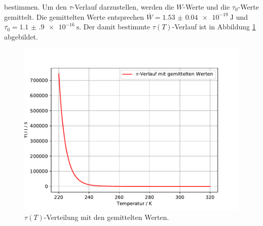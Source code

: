 bestimmen.
Um den $\tau$-Verlauf darzustellen, werden die $W$-Werte und die $\tau_0$-Werte gemittelt. Die gemittelten 
Werte entsprechen $\overline{W}=\SI{1.53(4)e-19}{\joule}$ und $\overline{\tau_{0}} = \SI{1.1(9)e-16}{\second}$.
Der damit bestimmte $\tau(T)$-Verlauf ist in Abbildung \ref{fig:tauvonT} abgebildet.
\FloatBarrier
\begin{figure}
    \centering
    \includegraphics[width = \textwidth, keepaspectratio]{figure/Tau_verlauf.pdf}
    \caption{$\tau(T)$-Verteilung mit den gemittelten Werten.}
    \label{fig:tauvonT}
\end{figure}